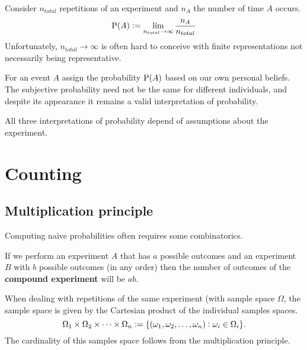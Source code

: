 \documentclass[../Year1/Year1.tex]{subfiles}
\begin{document}
\begin{definition}
    Consider $n_{total}$ repetitions of an experiment and $n_A$ the number of time $A$ occurs.
    \[\P(A) := \lim_{n_{total} \to \infty} \frac{n_A}{n_{total}}\]
    Unfortunately, $n_{total} \to \infty$ is often hard to conceive with finite representations not necessarily being representative.
\end{definition}

\begin{definition}
    For an event $A$ assign the probability $\P(A)$ based on our own personal beliefs. The subjective probability need not be the same for different individuals, and despite its appearance it remains a valid interpretation of probability.
\end{definition}

\begin{remark}
    All three interpretations of probability depend of assumptions about the experiment.
\end{remark}


\section{Counting}
\subsection{Multiplication principle}
Computing naive probabilities often requires some combinatorics.

\begin{definition}
    If we perform an experiment $A$ that has $a$ possible outcomes and an experiment $B$ with $b$ possible outcomes (in any order) then the number of outcomes of the  \textbf{compound experiment} will be $ab$.
\end{definition}

\begin{remark}
    When dealing with repetitions of the same experiment (with sample space $\Omega$, the sample space is given by the Cartesian product of the individual samples spaces.
    \[
        \Omega_1 \times \Omega_2 \times \cdots \times \Omega_n :=  \{(\omega_1,\omega_2,\ldots,\omega_n): \omega_i \in \Omega_i\}\textcolor{black}{.}
    \]
    The cardinality of this samples space follows from the multiplication principle.
\end{remark}
\end{document}
